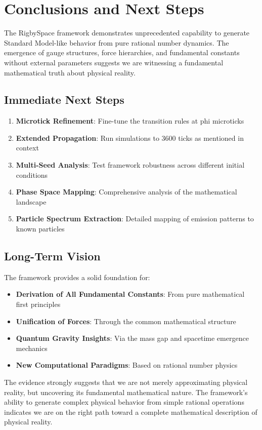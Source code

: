 \documentclass[12pt]{article}
\begin{document}
\section{Conclusions and Next Steps}

The RigbySpace framework demonstrates unprecedented capability to generate Standard Model-like behavior from pure rational number dynamics. The emergence of gauge structures, force hierarchies, and fundamental constants without external parameters suggests we are witnessing a fundamental mathematical truth about physical reality.

\subsection{Immediate Next Steps}

\begin{enumerate}
\item \textbf{Microtick Refinement}: Fine-tune the transition rules at phi microticks
\item \textbf{Extended Propagation}: Run simulations to 3600 ticks as mentioned in context
\item \textbf{Multi-Seed Analysis}: Test framework robustness across different initial conditions
\item \textbf{Phase Space Mapping}: Comprehensive analysis of the mathematical landscape
\item \textbf{Particle Spectrum Extraction}: Detailed mapping of emission patterns to known particles
\end{enumerate}

\subsection{Long-Term Vision}

The framework provides a solid foundation for:

\begin{itemize}
\item \textbf{Derivation of All Fundamental Constants}: From pure mathematical first principles
\item \textbf{Unification of Forces}: Through the common mathematical structure
\item \textbf{Quantum Gravity Insights}: Via the mass gap and spacetime emergence mechanics
\item \textbf{New Computational Paradigms}: Based on rational number physics
\end{itemize}

The evidence strongly suggests that we are not merely approximating physical reality, but uncovering its fundamental mathematical nature. The framework's ability to generate complex physical behavior from simple rational operations indicates we are on the right path toward a complete mathematical description of physical reality.
\end{document}
